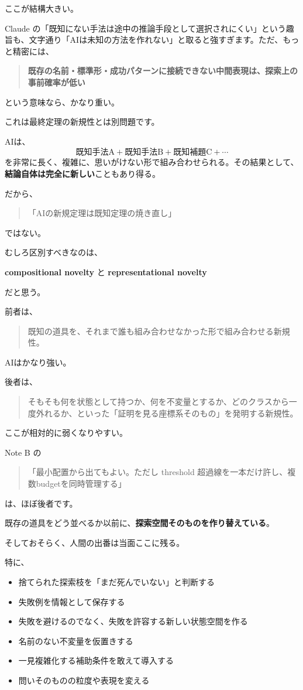 \documentclass[11pt,a4paper]{article}
\begin{document}
ここが結構大きい。

Claude の「既知にない手法は途中の推論手段として選択されにくい」という趣旨も、文字通り「AIは未知の方法を作れない」と取ると強すぎます。ただ、もっと精密には、
\begin{quote}
\textbf{既存の名前・標準形・成功パターンに接続できない中間表現は、探索上の事前確率が低い}
\end{quote}
という意味なら、かなり重い。

これは最終定理の新規性とは別問題です。

AIは、
\[
\text{既知手法A}
+\text{既知手法B}
+\text{既知補題C}
+\cdots
\]
を非常に長く、複雑に、思いがけない形で組み合わせられる。その結果として、\textbf{結論自体は完全に新しい}こともあり得る。

だから、
\begin{quote}
「AIの新規定理は既知定理の焼き直し」
\end{quote}
ではない。

むしろ区別すべきなのは、

\textbf{compositional novelty}
と
\textbf{representational novelty}

だと思う。

前者は、
\begin{quote}
既知の道具を、それまで誰も組み合わせなかった形で組み合わせる新規性。
\end{quote}
AIはかなり強い。

後者は、
\begin{quote}
そもそも何を状態として持つか、何を不変量とするか、どのクラスから一度外れるか、といった「証明を見る座標系そのもの」を発明する新規性。
\end{quote}
ここが相対的に弱くなりやすい。

Note B の
\begin{quote}
「最小配置から出てもよい。ただし threshold 超過線を一本だけ許し、複数budgetを同時管理する」
\end{quote}
は、ほぼ後者です。

既存の道具をどう並べるか以前に、\textbf{探索空間そのものを作り替えている}。

そしておそらく、人間の出番は当面ここに残る。

特に、
\begin{itemize}[leftmargin=2em]
\item 捨てられた探索枝を「まだ死んでいない」と判断する
\item 失敗例を情報として保存する
\item 失敗を避けるのでなく、失敗を許容する新しい状態空間を作る
\item 名前のない不変量を仮置きする
\item 一見複雑化する補助条件を敢えて導入する
\item 問いそのものの粒度や表現を変える
\end{itemize}
\end{document}
